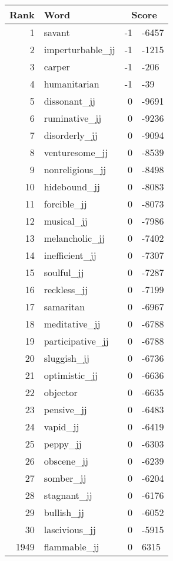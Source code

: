 \begin{longtable}[!htbp]{| rlr@{.}l |}
    \hline
    \textbf{Rank} & \textbf{Word} & \multicolumn{2}{c|}{\textbf{Score}} \\
    \hline
    \endhead
    1 & savant & -1 & -6457 \\
    2 & imperturbable\_jj & -1 & -1215 \\
    3 & carper & -1 & -206 \\
    4 & humanitarian & -1 & -39 \\
    5 & dissonant\_jj & 0 & -9691 \\
    6 & ruminative\_jj & 0 & -9236 \\
    7 & disorderly\_jj & 0 & -9094 \\
    8 & venturesome\_jj & 0 & -8539 \\
    9 & nonreligious\_jj & 0 & -8498 \\
    10 & hidebound\_jj & 0 & -8083 \\
    11 & forcible\_jj & 0 & -8073 \\
    12 & musical\_jj & 0 & -7986 \\
    13 & melancholic\_jj & 0 & -7402 \\
    14 & inefficient\_jj & 0 & -7307 \\
    15 & soulful\_jj & 0 & -7287 \\
    16 & reckless\_jj & 0 & -7199 \\
    17 & samaritan & 0 & -6967 \\
    18 & meditative\_jj & 0 & -6788 \\
    19 & participative\_jj & 0 & -6788 \\
    20 & sluggish\_jj & 0 & -6736 \\
    21 & optimistic\_jj & 0 & -6636 \\
    22 & objector & 0 & -6635 \\
    23 & pensive\_jj & 0 & -6483 \\
    24 & vapid\_jj & 0 & -6419 \\
    25 & peppy\_jj & 0 & -6303 \\
    26 & obscene\_jj & 0 & -6239 \\
    27 & somber\_jj & 0 & -6204 \\
    28 & stagnant\_jj & 0 & -6176 \\
    29 & bullish\_jj & 0 & -6052 \\
    30 & lascivious\_jj & 0 & -5915 \\
    1949 & flammable\_jj & 0 & 6315 \\

\end{longtable}
